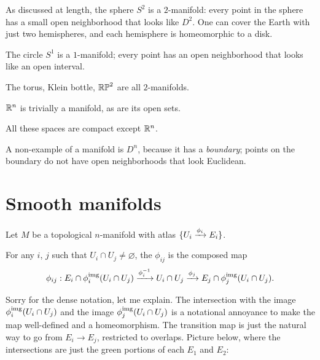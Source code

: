 \begin{example}
	\listhack
	\begin{enumerate}[(a)]
		\ii As discussed at length,
		the sphere $S^2$ is a $2$-manifold: every point in the sphere has a
		small open neighborhood that looks like $D^2$.
		One can cover the Earth with just two hemispheres,
		and each hemisphere is homeomorphic to a disk.

		\ii The circle $S^1$ is a $1$-manifold; every point has an
		open neighborhood that looks like an open interval.

		\ii The torus, Klein bottle, $\mathbb{RP}^2$ are all $2$-manifolds.

		\ii $\mathbb R^n$ is trivially a manifold, as are its open sets.
	\end{enumerate}
	All these spaces are compact except $\mathbb R^n$.

	A non-example of a manifold is $D^n$, because it has a \emph{boundary};
	points on the boundary do not have open neighborhoods
	that look Euclidean.
\end{example}

\section{Smooth manifolds}

Let $M$ be a topological $n$-manifold with atlas
$\{U_i \xrightarrow{\phi_i} E_i\}$.
\begin{definition}
	For any $i$, $j$ such that $U_i \cap U_j \neq \varnothing$,
	the  $\phi_{ij}$ is the composed map
	\[
		\phi_{ij} : E_i \cap \phi_i^{\text{img}}(U_i \cap U_j)
		\xrightarrow{\phi_i^{-1}}
		U_i \cap U_j
		\xrightarrow{\phi_j} E_j \cap \phi_j^{\text{img}}(U_i \cap U_j).
	\]
\end{definition}
Sorry for the dense notation, let me explain.
The intersection with the image $\phi_i^{\text{img}}(U_i \cap U_j)$
and the image $\phi_j^{\text{img}}(U_i \cap U_j)$ is a notational annoyance
to make the map well-defined and a homeomorphism.
The transition map is just the natural way to go from $E_i \to E_j$,
restricted to overlaps.
Picture below, where the intersections are just the green portions
of each $E_1$ and $E_2$:

